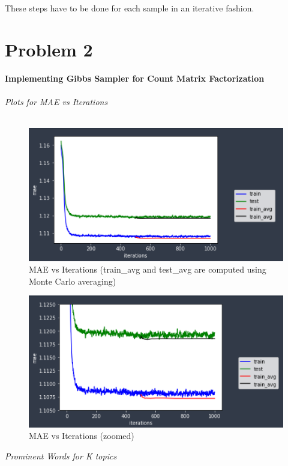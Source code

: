 \documentclass{article}
\begin{document}
These steps have to be done for each sample in an iterative fashion.

\section*{Problem 2}
\textbf{Implementing Gibbs Sampler for Count Matrix Factorization} \\ \\
\textit{Plots for MAE vs Iterations} \\ \\
\begin{figure}[h!]
\begin{center}
\includegraphics[scale=0.5]{mae_p2.png}
\caption{MAE vs Iterations (train\_avg and test\_avg are computed using Monte Carlo averaging)}
\label{mae}
\end{center}
\end{figure}

\begin{figure}[h!]
\begin{center}
\includegraphics[scale=0.5]{mae_p2_zoom.png}
\caption{MAE vs Iterations (zoomed)}
\label{maeZ}
\end{center}
\end{figure}
\textit{Prominent Words for K topics} \\ \\
\end{document}
